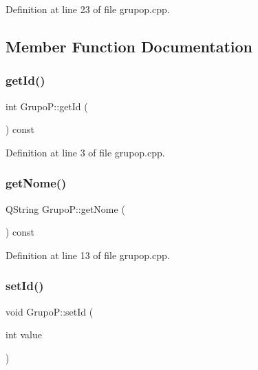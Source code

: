 Definition at line 23 of file grupop.\+cpp.



\subsection{Member Function Documentation}
\hypertarget{class_grupo_p_a3c72988138413046461c510b97ef7605}{}\label{class_grupo_p_a3c72988138413046461c510b97ef7605} 
\subsubsection{\texorpdfstring{get\+Id()}{getId()}}
{\footnotesize\ttfamily int Grupo\+P\+::get\+Id (\begin{DoxyParamCaption}{ }\end{DoxyParamCaption}) const}



Definition at line 3 of file grupop.\+cpp.

\hypertarget{class_grupo_p_ac3b0a8d64e082b45a7d362c69d934cd7}{}\label{class_grupo_p_ac3b0a8d64e082b45a7d362c69d934cd7} 
\subsubsection{\texorpdfstring{get\+Nome()}{getNome()}}
{\footnotesize\ttfamily Q\+String Grupo\+P\+::get\+Nome (\begin{DoxyParamCaption}{ }\end{DoxyParamCaption}) const}



Definition at line 13 of file grupop.\+cpp.

\hypertarget{class_grupo_p_a540f8d78b7468b26b647485cc72fd7ca}{}\label{class_grupo_p_a540f8d78b7468b26b647485cc72fd7ca} 
\subsubsection{\texorpdfstring{set\+Id()}{setId()}}
{\footnotesize\ttfamily void Grupo\+P\+::set\+Id (\begin{DoxyParamCaption}\item[{int}]{value }\end{DoxyParamCaption})}



